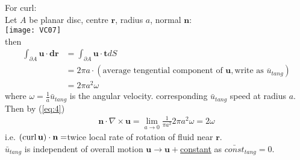 \documentclass[a4paper]{article}
\begin{document}
\begin{eg}
For curl:\\
Let $A$ be planar disc, centre $\mathbf{r}$, radius $a$, normal $\mathbf{n}$:\\
\texttt{[image: VC07]}\\
then
\begin{equation*}
\begin{aligned}
\int_{\partial A} \mathbf{u}\cdot\mathbf{dr} &= \int_{\partial A} \mathbf{u}\cdot\mathbf{t} dS\\
&= 2\pi a \cdot (\text{average tengential component of }\mathbf{u}, \text{write as }\overline{u}_{tang})\\
&= 2\pi a^2 \omega
\end{aligned}
\end{equation*}
where $\omega = \frac{1}{a} \bar{u}_{tang}$ is the angular velocity. corresponding $\bar{u}_{tang}$ speed at radius $a$.\\
Then by (\ref{eq:4})
\begin{equation*}
\begin{aligned}
\mathbf{n}\cdot\nabla\times\mathbf{u}=\lim_{a\to 0} \frac{1}{\pi a^2} 2\pi a^2 \omega = 2\omega
\end{aligned}
\end{equation*}
i.e. $\left(\operatorname{curl} \mathbf{u}\right)\cdot\mathbf{n}=$twice local rate of rotation of fluid near $\mathbf{r}$.\\
$\bar{u}_{tang}$ is independent of overall motion $\mathbf{u}\to\mathbf{u} + $\underline{constant} as $\bar{const}_{tang} = 0$.
\end{eg}

\newpage
\end{document}
